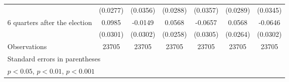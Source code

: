 \begin{table}[htbp]
\begin{tabular}{l*{6}{c}}
                    &    (0.0277)         &    (0.0356)         &    (0.0288)         &    (0.0357)         &    (0.0289)         &    (0.0345)         \\
[1em]
 6 quarters after the election&      0.0985\sym{**} &     -0.0149         &      0.0568\sym{*}  &     -0.0657\sym{*}  &      0.0568\sym{*}  &     -0.0646\sym{*}  \\
                    &    (0.0301)         &    (0.0302)         &    (0.0258)         &    (0.0305)         &    (0.0264)         &    (0.0302)         \\
\hline
Observations        &       23705         &       23705         &       23705         &       23705         &       23705         &       23705         \\
\hline\hline
\multicolumn{7}{l}{\footnotesize Standard errors in parentheses}\\
\multicolumn{7}{l}{\footnotesize \sym{*} \(p<0.05\), \sym{**} \(p<0.01\), \sym{***} \(p<0.001\)}\\
\end{tabular}
\end{table}
